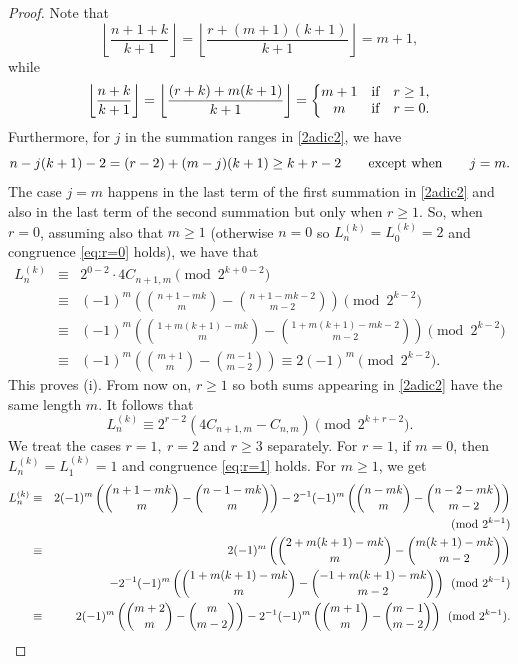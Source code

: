 \documentclass[10pt,a4paper]{amsart}
\begin{document}
\begin{proof}
Note that 
$$
\left\lfloor \frac{n+1+k}{k+1}\right\rfloor=\left\lfloor \frac{r+(m+1)(k+1)}{k+1}\right\rfloor=m+1,
$$
while
$$
\left\lfloor \frac{n+k}{k+1}\right\rfloor=\left\lfloor \frac{(r+k)+m(k+1)}{k+1}\right\rfloor=\left\{\begin{matrix} m+1 & {\text{\rm if}} & r\ge 1,\\ m & {\text{\rm if}} & r=0. \end{matrix}\right.
$$
Furthermore,  for $j$ in the summation ranges in \eqref{2adic2}, we have 
$$
n-j(k+1)-2=(r-2)+(m-j)(k+1)\ge k+r-2\qquad {\text{\rm except~when}}\qquad j=m.
$$
The case $j=m$ happens in the last term of the first summation in \eqref{2adic2} and also in the last term of the second summation but only when $r\ge 1$. So, when $r=0$, assuming also that 
$m\ge 1$ (otherwise $n=0$ so $L_n^{(k)}=L_0^{(k)}=2$ and congruence \eqref{eq:r=0} holds), we have that 
\begin{eqnarray*}
L_n^{(k)} & \equiv &  2^{0-2}\cdot 4 C_{n+1,m} \pmod {2^{k+0-2}}\\
&\equiv& (-1)^m \left(\binom{n+1-mk}{m}-\binom{n+1-mk-2}{m-2}\right)\pmod {2^{k-2}}\\
& \equiv &  (-1)^m \left(\binom{1+m(k+1)-mk}{m}-\binom{1+m(k+1)-mk-2}{m-2}\right)\pmod {2^{k-2}}\\
& \equiv &  (-1)^m \left(\binom{m+1}{m}-\binom{m-1}{m-2}\right) \equiv  2(-1)^m \pmod {2^{k-2}}.
\end{eqnarray*}
This proves (i). From now on, $r\ge 1$ so both sums appearing in \eqref{2adic2} have the same length $m$. It follows that 
$$
L_n^{(k)}\equiv 2^{r-2}\left(4C_{n+1,m}-C_{n,m}\right)\pmod {2^{k+r-2}}.
$$
We treat the cases $r=1,~r=2$ and $r\ge 3$ separately. For $r=1$, if $m=0$, then $L_n^{(k)}=L_1^{(k)}=1$ and congruence \eqref{eq:r=1} holds. For $m\ge 1$, we get
\begin{eqnarray*}
L_n^{(k)} & \equiv & 2(-1)^m \left(\binom{n+1-mk}{m}-\binom{n-1-mk}{m}\right)-2^{-1}(-1)^m \left(\binom{n-mk}{m}-\binom{n-2-mk}{m-2}\right)\\
&~&\hfill\pmod {2^{k-1}}\\
& \equiv &  
2(-1)^m \left(\binom{2+m(k+1)-mk}{m}-\binom{m(k+1)-mk}{m-2}\right)\\ 
& ~& \qquad-2^{-1}(-1)^m \left(\binom{1+m(k+1)-mk}{m}-\binom{-1+m(k+1)-mk}{m-2}\right)\pmod {2^{k-1}}\\
& \equiv &  
2(-1)^m \left(\binom{m+2}{m}-\binom{m}{m-2}\right)-2^{-1}(-1)^m\left(\binom{m+1}{m}-\binom{m-1}{m-2}\right)\pmod {2^{k-1}}.\\

\end{eqnarray*}
\end{proof}
\end{document}
